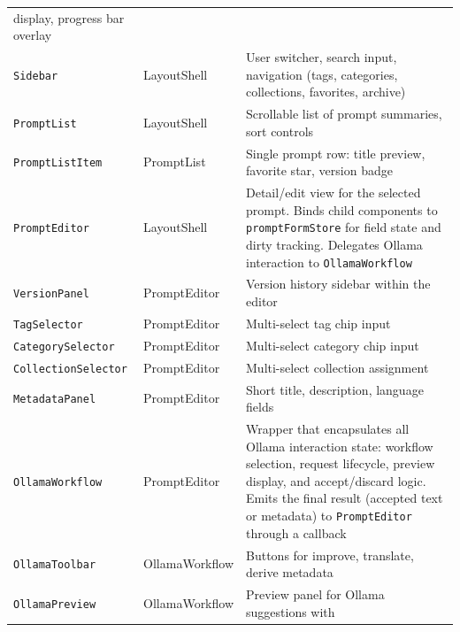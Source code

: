 \documentclass[a4paper, 11pt, oneside]{report}
\begin{document}
\begin{longtable}{l l L{7.5cm}}
                                                   display, progress bar overlay \\
  \texttt{Sidebar}          & LayoutShell       & User switcher, search input, navigation (tags,
                                                   categories, collections, favorites, archive) \\
  \texttt{PromptList}       & LayoutShell       & Scrollable list of prompt summaries, sort controls \\
  \texttt{PromptListItem}   & PromptList        & Single prompt row: title preview, favorite star,
                                                   version badge \\
  \texttt{PromptEditor}     & LayoutShell       & Detail/edit view for the selected prompt.
                                                   Binds child components to
                                                   \texttt{promptFormStore} for field state
                                                   and dirty tracking.  Delegates Ollama
                                                   interaction to \texttt{OllamaWorkflow} \\
  \texttt{VersionPanel}     & PromptEditor      & Version history sidebar within the editor \\
  \texttt{TagSelector}      & PromptEditor      & Multi-select tag chip input \\
  \texttt{CategorySelector} & PromptEditor      & Multi-select category chip input \\
  \texttt{CollectionSelector}& PromptEditor     & Multi-select collection assignment \\
  \texttt{MetadataPanel}    & PromptEditor      & Short title, description, language fields \\
  \texttt{OllamaWorkflow}   & PromptEditor      & Wrapper that encapsulates all Ollama interaction
                                                   state: workflow selection, request lifecycle,
                                                   preview display, and accept/discard logic.
                                                   Emits the final result (accepted text or metadata)
                                                   to \texttt{PromptEditor} through a callback \\
  \texttt{OllamaToolbar}    & OllamaWorkflow    & Buttons for improve, translate, derive metadata \\
  \texttt{OllamaPreview}    & OllamaWorkflow    & Preview panel for Ollama suggestions with

\end{longtable}
\end{document}
